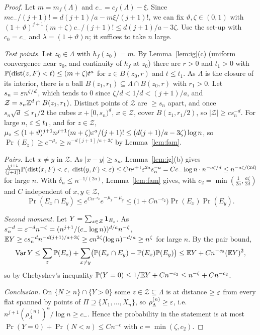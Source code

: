 \documentclass[11pt]{article}
\begin{document}
\begin{proof}
Let $m=m_f(\Lambda)$ and $c_-=c_f(\Lambda)-\xi$. Since $mc_-/(j+1)!=d(j+1)/a-m\xi/(j+1)!$, we can fix $\vartheta,\zeta\in(0,1)$ with
$(1+\vartheta)^{j+1}(m+\zeta)c_-/(j+1)!\le d(j+1)/a-3\zeta$. Use the set-up with $c_0=c_-$ and $\lambda=(1+\vartheta)n$; it suffices to take $n$ large.

\emph{Test points.} Let $z_0\in\Lambda$ with $h_f(z_0)=m$. By Lemma~\ref{lem:ig}(c) (uniform convergence near $z_0$, and continuity of
$h_f$ at $z_0$) there are $r>0$ and $t_1>0$ with $\mathbb{P}(\operatorname{dist}(z,F)<t)\le(m+\zeta)t^a$ for $z\in B(z_0,r)$ and $t\le t_1$. As $\Lambda$ is the
closure of its interior, there is a ball $B(z_1,r_1)\subseteq\Lambda\cap B(z_0,r)$ with $r_1>0$. Let $s_n=\varepsilon n^{\zeta/d}$, which tends to
$0$ since $\zeta/d<1/d<(j+1)/a$, and $\mathcal Z=s_n\mathbb{Z}^d\cap B(z_1,r_1)$. Distinct points of $\mathcal Z$ are $\ge s_n$ apart, and once $s_n\sqrt d\le r_1/2$
the cubes $x+[0,s_n)^d$, $x\in\mathcal Z$, cover $B(z_1,r_1/2)$, so $|\mathcal Z|\ge cs_n^{-d}$. For large $n$, $\varepsilon\le t_1$, and for $z\in\mathcal Z$,
$\mu_z\le(1+\vartheta)^{j+1}n^{j+1}(m+\zeta)\varepsilon^a/(j+1)!\le(d(j+1)/a-3\zeta)\log n$, so $\Pr(E_z)\ge e^{-\mu_z}\ge n^{-d(j+1)/a+3\zeta}$ by
Lemma~\ref{lem:fam}.

\emph{Pairs.} Let $x\ne y$ in $\mathcal Z$. As $|x-y|\ge s_n$, Lemma~\ref{lem:ig}(b) gives
$\frac{\lambda^{j+1}}{(j+1)!}\Pr(\dist(x,F)<\eps,\ \dist(y,F)<\eps)\le Cn^{j+1}\eps^{2a}s_n^{-a}=Cc_-\log n\cdot n^{-a\zeta/d}\le n^{-a\zeta/(2d)}$ for large $n$.
With $\delta_n\le n^{-1/(2a)}$, Lemma~\ref{lem:fam} gives, with $c_2=\min(\frac1{2a},\frac{a\zeta}{2d})$ and $C$ independent of $x,y\in\mathcal Z$,
\[
  \Pr(E_x \cap E_y) \le e^{Cn^{-c_2}}e^{-\mu_x-\mu_y}\le\bigl(1+Cn^{-c_2}\bigr)\Pr(E_x)\Pr(E_y).
\]

\emph{Second moment.} Let $Y = \sum_{z \in\mathcal Z}\mathbf{1}_{E_z}$. As $s_n^{-d}=\varepsilon^{-d}n^{-\zeta}=(n^{j+1}/(c_-\log n))^{d/a}n^{-\zeta}$,
$\mathbb{E} Y\ge cs_n^{-d}n^{-d(j+1)/a+3\zeta}\ge cn^{2\zeta}(\log n)^{-d/a}\ge n^\zeta$ for large $n$. By the pair bound,
\[
  \operatorname{Var}Y\le\sum_z\mathbb{P}(E_z)+\sum_{x\ne y}\bigl(\mathbb{P}(E_x\cap E_y)-\mathbb{P}(E_x)\mathbb{P}(E_y)\bigr)\le\mathbb{E} Y+Cn^{-c_2}(\mathbb{E} Y)^2,
\]
so by Chebyshev's inequality $\mathbb{P}(Y = 0) \le 1/\mathbb{E} Y + Cn^{-c_2}\le n^{-\zeta}+Cn^{-c_2}$.

\emph{Conclusion.} On $\{N\ge n\}\cap\{Y>0\}$ some $z\in\mathcal Z\subseteq\Lambda$ is at distance $\ge\varepsilon$ from every flat spanned by points of
$\Pi\supseteq\{X_1,\dots,X_n\}$, so $\rho_\Lambda^{(n)}\ge\varepsilon$, i.e.\ $n^{j+1}(\rho_\Lambda^{(n)})^a/\log n\ge c_-$. Hence the probability in the
statement is at most $\Pr(Y=0)+\Pr(N<n)\le Cn^{-c}$ with $c=\min(\zeta,c_2)$.
\end{proof}
\end{document}
